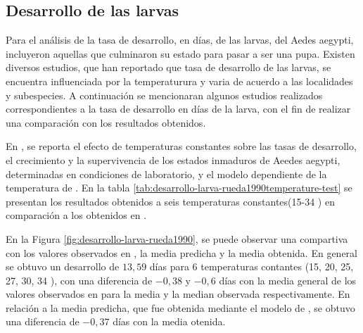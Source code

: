 \subsection{Desarrollo de las larvas}
Para el análisis de la tasa de desarrollo, en días, de las larvas, del Aedes aegypti, incluyeron
aquellas que culminaron su estado para pasar a ser una pupa. Existen diversos
estudios, que han reportado que tasa de desarrollo de las larvas, se encuentra influenciada por la
temperaturura y varia de acuerdo a las localidades y subespecies. A continuación se mencionaran
algunos estudios realizados correspondientes a la tasa de desarrollo en días de la larva, con el
fin de realizar una comparación con los resultados obtenidos.

En \cite{rueda1990temperature}, se reporta el efecto de  temperaturas constantes sobre las tasas
de desarrollo, el crecimiento y la supervivencia de los estados inmaduros de Aeedes aegypti,
determinadas en condiciones de laboratorio, y el modelo dependiente de la temperatura de
\cite{sharpe1977reaction}. En la tabla \ref{tab:desarrollo-larva-rueda1990temperature-test} se
presentan los resultados obtenidos a seis temperaturas constantes(15-34 \textcelsius) en
comparación a los obtenidos en \cite{rueda1990temperature}.

En la Figura \ref{fig:desarrollo-larva-rueda1990}, se puede observar una compartiva con los
valores observados en \cite{rueda1990temperature}, la media predicha y la media obtenida. En
general se obtuvo un desarrollo de $13,59$ días para 6 temperaturas contantes (15, 20, 25, 27,
30, 34 \textcelsius), con una diferencia de $-0,38$ y $-0,6$ días con la media general de los
valores observados en \cite{rueda1990temperature} para la media y la median observada respectivamente. En relación a la media predicha, que fue obtenida mediante el modelo de
\cite{sharpe1977reaction}, se obtuvo una diferencia de $-0,37$ días con la media otenida.

